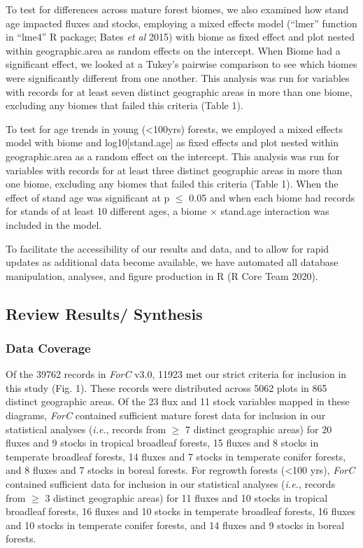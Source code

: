 \documentclass[
]{article}
\begin{document}
To test for differences across mature forest biomes, we also examined
how stand age impacted fluxes and stocks, employing a mixed effects
model (``lmer'' function in ``lme4'' R package; Bates \emph{et al} 2015)
with biome as fixed effect and plot nested within geographic.area as
random effects on the intercept. When Biome had a significant effect, we
looked at a Tukey's pairwise comparison to see which biomes were
significantly different from one another. This analysis was run for
variables with records for at least seven distinct geographic areas in
more than one biome, excluding any biomes that failed this criteria
(Table 1).

To test for age trends in young (\textless100yrs) forests, we employed a
mixed effects model with biome and log10{[}stand.age{]} as fixed effects
and plot nested within geographic.area as a random effect on the
intercept. This analysis was run for variables with records for at least
three distinct geographic areas in more than one biome, excluding any
biomes that failed this criteria (Table 1). When the effect of stand age
was significant at p \(\le\) 0.05 and when each biome had records for
stands of at least 10 different ages, a biome \(\times\) stand.age
interaction was included in the model.

To facilitate the accessibility of our results and data, and to allow
for rapid updates as additional data become available, we have automated
all database manipulation, analyses, and figure production in R (R Core
Team 2020).

\hypertarget{review-results-synthesis}{%
\subsection{Review Results/ Synthesis}\label{review-results-synthesis}}

\hypertarget{data-coverage}{%
\subsubsection{Data Coverage}\label{data-coverage}}

Of the 39762 records in \emph{ForC} v3.0, 11923 met our strict criteria
for inclusion in this study (Fig. 1). These records were distributed
across 5062 plots in 865 distinct geographic areas. Of the 23 flux and
11 stock variables mapped in these diagrams, \emph{ForC} contained
sufficient mature forest data for inclusion in our statistical analyses
(\emph{i.e.}, records from \(\ge\) 7 distinct geographic areas) for 20
fluxes and 9 stocks in tropical broadleaf forests, 15 fluxes and 8
stocks in temperate broadleaf forests, 14 fluxes and 7 stocks in
temperate conifer forests, and 8 fluxes and 7 stocks in boreal forests.
For regrowth forests (\textless100 yrs), \emph{ForC} contained
sufficient data for inclusion in our statistical analyses (\emph{i.e.},
records from \(\ge\) 3 distinct geographic areas) for 11 fluxes and 10
stocks in tropical broadleaf forests, 16 fluxes and 10 stocks in
temperate broadleaf forests, 16 fluxes and 10 stocks in temperate
conifer forests, and 14 fluxes and 9 stocks in boreal forests.
\end{document}

